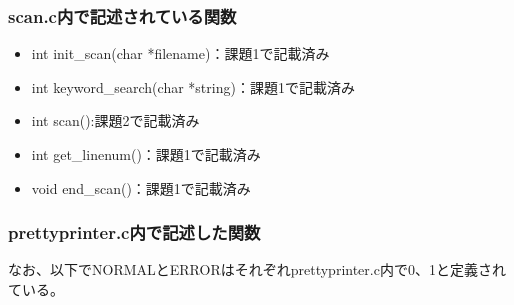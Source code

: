 \documentclass{jarticle}
\begin{document}
\subsubsection{scan.c内で記述されている関数}
\begin{itemize}
  \item int init\_scan(char *filename)：課題1で記載済み
  \item int keyword\_search(char *string)：課題1で記載済み
  \item int scan():課題2で記載済み
  \item int get\_linenum()：課題1で記載済み
  \item void end\_scan()：課題1で記載済み
\end{itemize}
\subsubsection{prettyprinter.c内で記述した関数}
なお、以下でNORMALとERRORはそれぞれprettyprinter.c内で0、1と定義されている。
\end{document}
